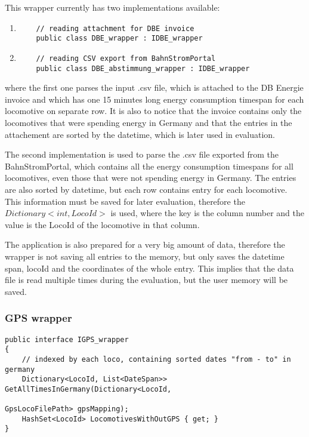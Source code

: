 \documentclass[11pt]{article}
\begin{document}
This wrapper currently has two implementations available:
\begin{enumerate}
    \item 
    {
    \begin{verbatim} 
    // reading attachment for DBE invoice
    public class DBE_wrapper : IDBE_wrapper
    \end{verbatim}
    }

    \item
    {
    \begin{verbatim} 
    // reading CSV export from BahnStromPortal
    public class DBE_abstimmung_wrapper : IDBE_wrapper
    \end{verbatim}
    }
\end{enumerate}
where the first one parses the input .csv file, which is attached to the DB Energie invoice and which has one 15 minutes long energy consumption timespan for each locomotive on separate row. It is also to notice that the invoice contains only the locomotives that were spending energy in Germany and that the entries in the attachement are sorted by the datetime, which is later used in evaluation.

The second implementation is used to parse the .csv file exported from the BahnStromPortal, which contains all the energy consumption timespans for all locomotives, even those that were not spending energy in Germany. The entries are also sorted by datetime, but each row contains entry for each locomotive. This information must be saved for later evaluation, therefore the \begin{math}Dictionary<int, LocoId>\end{math} is used, where the key is the column number and the value is the LocoId of the locomotive in that column.

The application is also prepared for a very big amount of data, therefore the wrapper is not saving all entries to the memory, but only saves the datetime span, locoId and the coordinates of the whole entry. This implies that the data file is read multiple times during the evaluation, but the user memory will be saved.

\pagebreak


\subsubsection{GPS wrapper}
\label{sec:GPSWrapper}

\begin{verbatim}
public interface IGPS_wrapper
{
    // indexed by each loco, containing sorted dates "from - to" in germany
    Dictionary<LocoId, List<DateSpan>> GetAllTimesInGermany(Dictionary<LocoId, 
                                                            GpsLocoFilePath> gpsMapping);
    HashSet<LocoId> LocomotivesWithOutGPS { get; }
}
\end{verbatim}
\end{document}
